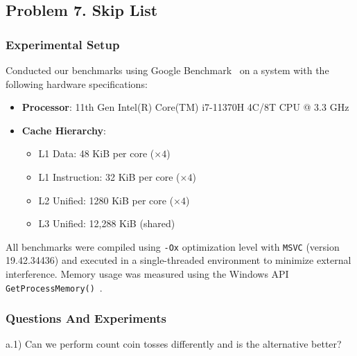 \documentclass[12pt]{article}
\begin{document}
	
	
	\subsection*{Problem 7. Skip List}
	\vspace{20pt}
	\subsubsection*{Experimental Setup}
	Conducted our benchmarks using Google Benchmark~\cite{google-bench} on a system with the following hardware specifications:

\begin{itemize}
	\small
    \item \textbf{Processor}: 11th Gen Intel(R) Core(TM) i7-11370H 4C/8T CPU @ 3.3 GHz
    \item \textbf{Cache Hierarchy}:
    \begin{itemize}
        \item L1 Data: 48 KiB per core (\(\times 4\))
        \item L1 Instruction: 32 KiB per core (\(\times 4\))
        \item L2 Unified: 1280 KiB per core (\(\times 4\))
        \item L3 Unified: 12,288 KiB (shared)
    \end{itemize}
\end{itemize}

All benchmarks were compiled using \texttt{-Ox} optimization level with \texttt{MSVC} (version 19.42.34436) and executed in a single-threaded environment to minimize external interference. Memory usage was measured using the Windows API \texttt{GetProcessMemory()}~\cite{getprocessmemoryinfo}.\\

\subsubsection*{Questions And Experiments}
	
a.1) Can we perform count coin tosses differently and is the alternative better?
\end{document}
